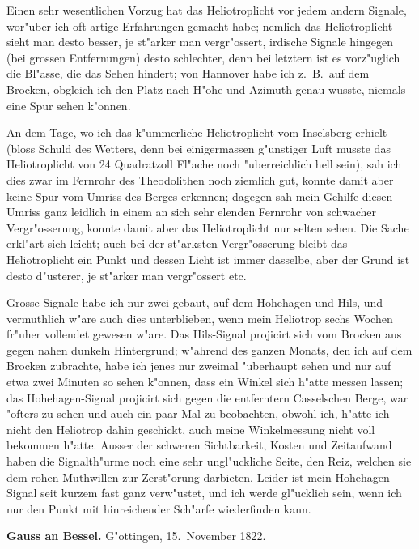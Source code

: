 \documentclass[12pt,a4paper]{article}
\theoremstyle{plain}
\theoremstyle{definition}
\theoremstyle{remark}
\begin{document}
Einen sehr wesentlichen Vorzug hat das Heliotroplicht vor jedem andern Signale, wor"uber ich oft artige Erfahrungen gemacht habe; nemlich das Heliotroplicht sieht man desto besser, je st"arker man vergr"ossert, irdische Signale hingegen (bei grossen Entfernungen) desto schlechter, denn bei letztern ist es vorz"uglich die Bl"asse, die das Sehen hindert; von Hannover habe ich z.~B.\ auf dem Brocken, obgleich ich den Platz nach H"ohe und Azimuth genau wusste, niemals eine Spur sehen k"onnen.

\newpage
\noindent An dem Tage, wo ich das k"ummerliche Heliotroplicht vom Inselsberg erhielt (bloss Schuld des Wetters, denn bei einigermassen g"unstiger Luft musste das Heliotroplicht von 24 Quadratzoll Fl"ache noch "uberreichlich hell sein), sah ich dies zwar im Fernrohr des Theodolithen noch ziemlich gut, konnte damit aber keine Spur vom Umriss des Berges erkennen; dagegen sah mein Gehilfe diesen Umriss ganz leidlich in einem an sich sehr elenden Fernrohr von schwacher Vergr"osserung, konnte damit aber das Heliotroplicht nur selten sehen. Die Sache erkl"art sich leicht; auch bei der st"arksten Vergr"osserung bleibt das Heliotroplicht ein Punkt und dessen Licht ist immer dasselbe, aber der Grund ist desto d"usterer, je st"arker man vergr"ossert etc.

Grosse Signale habe ich nur zwei gebaut, auf dem Hohehagen und Hils, und vermuthlich w"are auch dies unterblieben, wenn mein Heliotrop sechs Wochen fr"uher vollendet gewesen w"are. Das Hils-Signal projicirt sich vom Brocken aus gegen nahen dunkeln Hintergrund; w"ahrend des ganzen Monats, den ich auf dem Brocken zubrachte, habe ich jenes nur zweimal "uberhaupt sehen und nur auf etwa zwei Minuten so sehen k"onnen, dass ein Winkel sich h"atte messen lassen; das Hohehagen-Signal projicirt sich gegen die entferntern Casselschen Berge, war "ofters zu sehen und auch ein paar Mal zu beobachten, obwohl ich, h"atte ich nicht den Heliotrop dahin geschickt, auch meine Winkelmessung nicht voll bekommen h"atte. Ausser der schweren Sichtbarkeit, Kosten und Zeitaufwand haben die Signalth"urme noch eine sehr ungl"uckliche Seite, den Reiz, welchen sie dem rohen Muthwillen zur Zerst"orung darbieten. Leider ist mein Hohehagen-Signal seit kurzem fast ganz verw"ustet, und ich werde gl"ucklich sein, wenn ich nur den Punkt mit hinreichender Sch"arfe wiederfinden kann.

\medskip
\noindent \textbf{Gauss an Bessel.} G"ottingen, 15.~November 1822.
\end{document}
